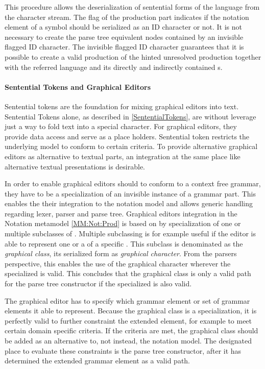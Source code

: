 This procedure allows the deserialization of sentential forms of the language from the character stream. The  flag of the production part indicates if the notation element of a symbol should be serialized as an ID character or not. It is not necessary to create the parse tree equivalent nodes contained by an invisible flagged ID character. The invisible flagged ID character guarantees that it is possible to create a valid production of the hinted unresolved production together with the referred language  and its directly and indirectly contained s.

\paragraph{Sentential Tokens and Graphical Editors}
Sentential tokens are the foundation for mixing graphical editors into text. Sentential Tokens alone, as described in \ref{SententialTokens}, are without leverage just a way to fold text into a special character.  For graphical editors, they provide data access and serve as a place holders. Sentential token restricts the underlying model to conform to certain criteria. To provide alternative graphical editors as alternative to textual parts, an integration at the same place like alternative textual presentations is desirable.

In order to enable graphical editors should to conform to a context free grammar, they have to be a specialization of an invisible instance of a grammar part. This enables the their integration to the notation model and allows generic handling regarding lexer, parser and parse tree. Graphical editors integration in the Notation metamodel \ref{MM:Not:Prod} is based on by specialization of one or multiple subclasses of . Multiple subclassing is for example useful if the editor is able to represent one or a  of a specific . This subclass is denominated as the \emph{graphical class}, its serialized form as \emph{graphical character}. From the parsers perspective, this enables the use of the graphical character wherever the specialized  is valid. This concludes that the graphical class is only a valid path for the parse tree constructor if the specialized  is also valid. 

The graphical editor has to specify which grammar element or set of grammar elements it able to represent. Because the graphical class is a specialization, it is perfectly valid to further constraint the extended element, for example to meet certain domain specific criteria. If the criteria are met, the graphical class should be added as an alternative to, not instead, the notation model. The designated place to evaluate these constraints is the parse tree constructor, after it has determined the extended grammar element as a valid path. 

